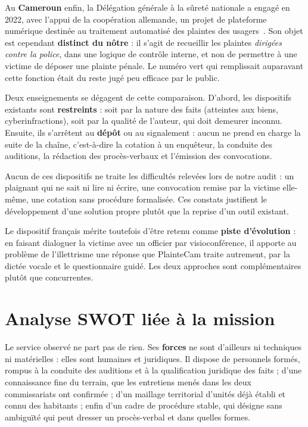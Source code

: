 Au \textbf{Cameroun} enfin, la Délégation générale à la sûreté nationale a engagé en 2022, avec l'appui de la coopération allemande, un projet de plateforme numérique destinée au traitement automatisé des plaintes des usagers~\cite{cameroun-dgsngiz}. Son objet est cependant \textbf{distinct du nôtre} : il s'agit de recueillir les plaintes \emph{dirigées contre la police}, dans une logique de contrôle interne, et non de permettre à une victime de déposer une plainte pénale. Le numéro vert qui remplissait auparavant cette fonction était du reste jugé peu efficace par le public.

Deux enseignements se dégagent de cette comparaison. D'abord, les dispositifs existants sont \textbf{restreints} : soit par la nature des faits (atteintes aux biens, cyberinfractions), soit par la qualité de l'auteur, qui doit demeurer inconnu. Ensuite, ils s'arrêtent au \textbf{dépôt} ou au signalement : aucun ne prend en charge la suite de la chaîne, c'est-à-dire la cotation à un enquêteur, la conduite des auditions, la rédaction des procès-verbaux et l'émission des convocations.

Aucun de ces dispositifs ne traite les difficultés relevées lors de notre audit : un plaignant qui ne sait ni lire ni écrire, une convocation remise par la victime elle-même, une cotation sans procédure formalisée. Ces constats justifient le développement d'une solution propre plutôt que la reprise d'un outil existant.

Le dispositif français mérite toutefois d'être retenu comme \textbf{piste d'évolution} : en faisant dialoguer la victime avec un officier par visioconférence, il apporte au problème de l'illettrisme une réponse que PlainteCam traite autrement, par la dictée vocale et le questionnaire guidé. Les deux approches sont complémentaires plutôt que concurrentes.

\section{Analyse SWOT liée à la mission}

Le service observé ne part pas de rien. Ses \textbf{forces} ne sont d'ailleurs ni techniques ni matérielles : elles sont humaines et juridiques. Il dispose de personnels formés, rompus à la conduite des auditions et à la qualification juridique des faits ; d'une connaissance fine du terrain, que les entretiens menés dans les deux commissariats ont confirmée ; d'un maillage territorial d'unités déjà établi et connu des habitants ; enfin d'un cadre de procédure stable, qui désigne sans ambiguïté qui peut dresser un procès-verbal et dans quelles formes.

